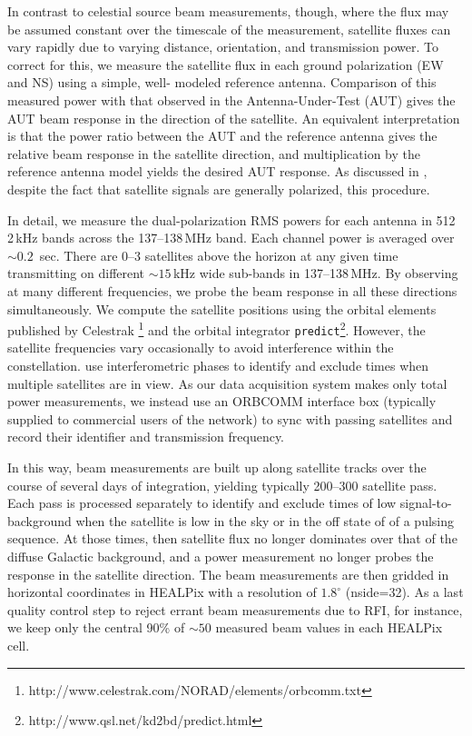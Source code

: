 \documentclass{emulateapj}
\begin{document}
In contrast to celestial source beam measurements, though, where the flux may be 
assumed constant over the timescale of the measurement, satellite fluxes can vary rapidly 
due to varying distance, orientation, and transmission power. To correct for this, we 
measure the satellite flux in each ground polarization (EW and NS) using a simple, well-
modeled reference antenna. Comparison of this measured power with that observed in the 
Antenna-Under-Test (AUT) gives the AUT beam response in the direction of the satellite. 
An equivalent interpretation is that the power ratio between the AUT and the reference 
antenna gives the relative beam response in the satellite direction, and multiplication by 
the reference antenna model yields the desired AUT response. As discussed in 
\citet{neben15}, despite the fact that satellite signals are generally polarized, this 
procedure.

In detail, we measure the dual-polarization RMS powers for each antenna in 512 2\,kHz 
bands across the 137--138\,MHz band. Each channel power is averaged over $\sim0.2$
\,sec. There are 0--3 satellites above the horizon at any given time transmitting on different 
$\sim15$\,kHz wide sub-bands in 137--138\,MHz. By observing at many different 
frequencies, we probe the beam response in all these directions simultaneously. We 
compute the satellite positions using the orbital elements published by Celestrak
\footnote{http://www.celestrak.com/NORAD/elements/orbcomm.txt} and the orbital 
integrator \texttt{predict}\footnote{http://www.qsl.net/kd2bd/predict.html}. However, the 
satellite frequencies vary occasionally to avoid interference within the constellation. 
\citet{zheng14} use interferometric phases to identify and exclude times when multiple 
satellites are in view. As our data acquisition system makes only total power 
measurements, we instead use an ORBCOMM interface box (typically supplied to 
commercial users of the network) to sync with passing satellites and record their identifier 
and transmission frequency.

In this way, beam measurements are built up along satellite tracks over the course of 
several days of integration, yielding typically 200--300 satellite pass. Each pass is 
processed separately to identify and exclude times of low signal-to-background when the 
satellite is low in the sky or in the off state of of a pulsing sequence. At those times, then 
satellite flux no longer dominates over that of the diffuse Galactic background, and a 
power measurement no longer probes the response in the satellite direction. The beam 
measurements are then gridded in horizontal coordinates in HEALPix with a resolution of 
$1.8^\circ$ (nside=32). As a last quality control step to reject errant beam measurements 
due to RFI, for instance, we keep only the central 90\% of $\sim50$ measured beam 
values in each HEALPix cell.
\end{document}
